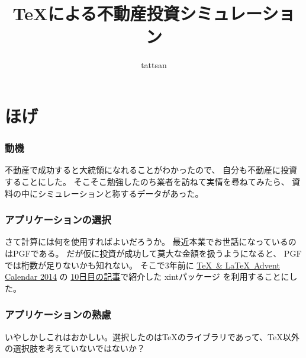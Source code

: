 \documentclass[dvipdfmx]{beamer}
\title{\TeX による不動産投資シミュレーション}
\author{tattsan}
\date{}
\newcommand{\たつ}{たつ}
\begin{document}
\begin{frame}\frametitle{}
\maketitle
\end{frame}

\section{ほげ} 

\begin{frame}[fragile]\frametitle{動機}
  不動産で成功すると\alert{大統領になれる}ことがわかったので、
  自分も不動産に投資することにした。
  そこそこ勉強したのち業者を訪ねて実情を尋ねてみたら、
  資料の中にシミュレーションと称するデータがあった。
\begin{block}{}\small
  \begin{dialogue}
    \speak{\たつ} 
      
  \end{dialogue}
\end{block}
\end{frame}


\begin{frame}[fragile]\frametitle{アプリケーションの選択}
  さて計算には何を使用すればよいだろうか。
  最近本業でお世話になっているのはPGFである。
  だが仮に投資が成功して莫大な金額を扱うようになると、
  PGFでは\alert{桁数が足りないかも}知れない。
  そこで3年前に
  \href{https://adventar.org/calendars/553}{\TeX ~\& \LaTeX ~Advent Calendar 2014} の
  \href{https://github.com/tattsan/xkansuji/wiki/texadventar14}{10日目の記事}で紹介した
  \alert{\textsf{xintパッケージ}}
  を利用することにした。
\end{frame}

\begin{frame}[fragile]\frametitle{アプリケーションの熟慮}
  いやしかしこれはおかしい。選択したのは\TeX のライブラリであって、\TeX 以外の選択肢を考えていないではないか？
  \bigskip\par
  \bigskip\par
\end{frame}
\end{document}
